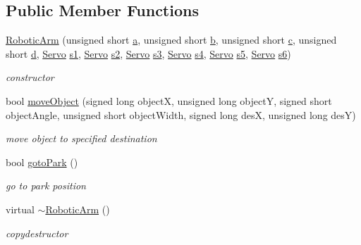 \subsection*{Public Member Functions}
\begin{DoxyCompactItemize}
\item 
\hyperlink{class_robotic_arm_acf99461f54580f6ccbafcc891e211037}{Robotic\+Arm} (unsigned short \hyperlink{class_robotic_arm_aaf0461b1cb35da93d2e446f50b9813a4}{a}, unsigned short \hyperlink{class_robotic_arm_a2758a63b85f492abda0e84f32fbfdd98}{b}, unsigned short \hyperlink{class_robotic_arm_a5f6cae6b67db69c97b75970dacc72ea8}{c}, unsigned short \hyperlink{class_robotic_arm_ada1f488e8627fcb18d4b15b70c593be8}{d}, \hyperlink{struct_servo}{Servo} \hyperlink{class_robotic_arm_a405680ac32df6d444683b997b785623f}{s1}, \hyperlink{struct_servo}{Servo} \hyperlink{class_robotic_arm_aeafd57f690026379493f193d94bd8210}{s2}, \hyperlink{struct_servo}{Servo} \hyperlink{class_robotic_arm_a9241e65a54080f2f642bd08a78a12f6f}{s3}, \hyperlink{struct_servo}{Servo} \hyperlink{class_robotic_arm_af0d9eb18ff10b252b79c8a986fe31170}{s4}, \hyperlink{struct_servo}{Servo} \hyperlink{class_robotic_arm_a393711dcc74eb1fba3f9e544cd2bb771}{s5}, \hyperlink{struct_servo}{Servo} \hyperlink{class_robotic_arm_a4816473ed62d262e2a29590769e82f10}{s6})
\begin{DoxyCompactList}\small\item\em constructor \end{DoxyCompactList}\item 
bool \hyperlink{class_robotic_arm_ad9add36d9fad6da469f30d1ffd867e63}{move\+Object} (signed long objectX, unsigned long objectY, signed short object\+Angle, unsigned short object\+Width, signed long desX, unsigned long desY)
\begin{DoxyCompactList}\small\item\em move object to specified destination \end{DoxyCompactList}\item 
bool \hyperlink{class_robotic_arm_a6ecfa07487d7c03717be1e5f1fdb1e21}{goto\+Park} ()
\begin{DoxyCompactList}\small\item\em go to park position \end{DoxyCompactList}\item 
virtual \hyperlink{class_robotic_arm_aa1e689d9e117cebbc50e8943333851e6}{$\sim$\+Robotic\+Arm} ()
\begin{DoxyCompactList}\small\item\em copydestructor \end{DoxyCompactList}\item 

\end{DoxyCompactItemize}
